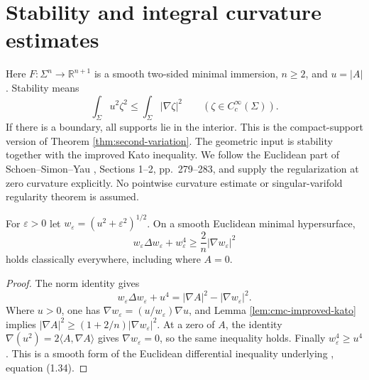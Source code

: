 \chapter{Stability and integral curvature estimates}\label{sec:stable-curvature-integrals}
Here $F:\Sigma^n\to\mathbb R^{n+1}$ is a smooth two-sided minimal immersion, $n\geq2$, and $u=|A|$. Stability means
\[
 \int_\Sigma u^2\zeta^2\leq\int_\Sigma|\nabla\zeta|^2
 \qquad(\zeta\in C_c^\infty(\Sigma)).
\]
If there is a boundary, all supports lie in the interior. This is the compact-support version of Theorem \ref{thm:second-variation}. The geometric input is stability together with the improved Kato inequality. We follow the Euclidean part of Schoen--Simon--Yau \cite{SSY75}, Sections 1--2, pp.~279--283, and supply the regularization at zero curvature explicitly. No pointwise curvature estimate or singular-varifold regularity theorem is assumed.

\begin{lemma}\label{lem:regularized-simons}
For $\varepsilon>0$ let $w_\varepsilon=(u^2+\varepsilon^2)^{1/2}$. On a smooth Euclidean minimal hypersurface,
\[
 w_\varepsilon\Delta w_\varepsilon+w_\varepsilon^4
 \geq\frac2n|\nabla w_\varepsilon|^2
\]
holds classically everywhere, including where $A=0$.
\end{lemma}
\begin{proof}
The norm identity gives
\[
 w_\varepsilon\Delta w_\varepsilon+u^4
 =|\nabla A|^2-|\nabla w_\varepsilon|^2.
\]
Where $u>0$, one has $\nabla w_\varepsilon=(u/w_\varepsilon)\nabla u$, and Lemma \ref{lem:cmc-improved-kato} implies
$|\nabla A|^2\geq(1+2/n)|\nabla w_\varepsilon|^2$. At a zero of $A$, the identity $\nabla(u^2)=2\langle A,\nabla A\rangle$ gives $\nabla w_\varepsilon=0$, so the same inequality holds. Finally $w_\varepsilon^4\geq u^4$. This is a smooth form of the Euclidean differential inequality underlying \cite{SSY75}, equation (1.34).
\end{proof}

